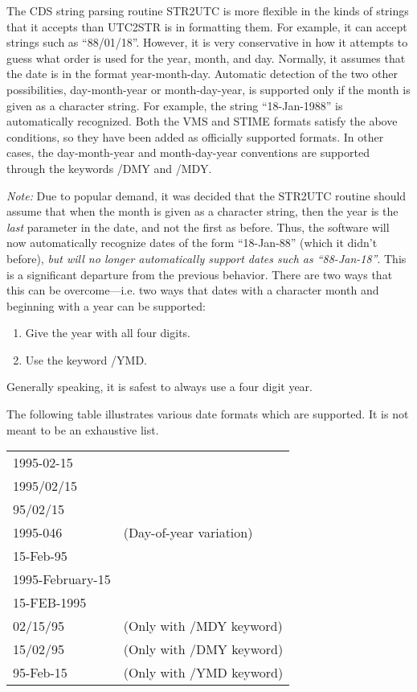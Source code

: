 The CDS string parsing routine STR2UTC is more flexible in the kinds of strings
that it accepts than UTC2STR is in formatting them.  For example, it can accept
strings such as \mbox{``88/01/18''}.  However, it is very conservative in how
it attempts to guess what order is used for the year, month, and day.
Normally, it assumes that the date is in the format year-month-day.  Automatic
detection of the two other possibilities, day-month-year or month-day-year, is
supported only if the month is given as a character string.  For example, the
string \mbox{``18-Jan-1988''} is automatically recognized.  Both the VMS and
STIME formats satisfy the above conditions, so they have been added as
officially supported formats.  In other cases, the day-month-year and
month-day-year conventions are supported through the keywords /DMY and /MDY.

{\em Note:} Due to popular demand, it was decided that the STR2UTC routine
should assume that when the month is given as a character string, then the year
is the {\em last} parameter in the date, and not the first as before.  Thus,
the software will now automatically recognize dates of the form
\mbox{``18-Jan-88''} (which it didn't before), {\em but will no longer
automatically support dates such as \mbox{``88-Jan-18''}}.  This is a
significant departure from the previous behavior.  There are two ways that this
can be overcome---i.e. two ways that dates with a character month and beginning
with a year can be supported:
\begin{enumerate}
\item
Give the year with all four digits.
\item
Use the keyword /YMD.
\end{enumerate}
Generally speaking, it is safest to always use a four digit year.

The following table illustrates various date formats which are supported.  It
is not meant to be an exhaustive list.
\begin{center}
\begin{tabular}{ll}
1995-02-15		&	\\
1995/02/15		&	\\
95/02/15		&	\\
1995-046		& (Day-of-year variation)\\
15-Feb-95		&	\\
1995-February-15	&	\\
15-FEB-1995		&	\\
02/15/95		& (Only with /MDY keyword)\\
15/02/95		& (Only with /DMY keyword)\\
95-Feb-15		& (Only with /YMD keyword)
\end{tabular}
\end{center}


